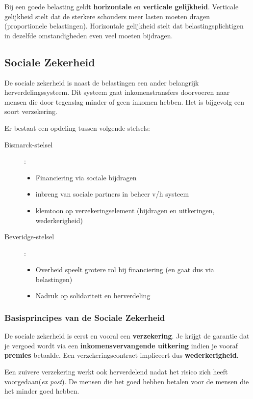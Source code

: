 Bij een goede belasting geldt \textbf{horizontale} en \textbf{verticale gelijkheid}. Verticale gelijkheid stelt dat de sterkere schouders meer lasten moeten dragen (proportionele belastingen). Horizontale gelijkheid stelt dat belastingsplichtigen in dezelfde omstandigheden even veel moeten bijdragen.

\subsection{Sociale Zekerheid}
De sociale zekerheid is naast de belastingen een ander belangrijk herverdelingssysteem. Dit systeem gaat inkomenstransfers doorvoeren naar mensen die door tegenslag minder of geen inkomen hebben. Het is bijgevolg een soort verzekering.

Er bestaat een opdeling tussen volgende stelsels:
\begin{description}
   \item[Bismarck-stelsel]:
      \begin{itemize}
         \item Financiering via sociale bijdragen
         \item inbreng van sociale partners in beheer v/h systeem
         \item klemtoon op verzekeringselement (bijdragen en uitkeringen, wederkerigheid)
      \end{itemize}
   \item[Beveridge-stelsel]:
      \begin{itemize}
         \item Overheid speelt grotere rol bij financiering (en gaat dus via belastingen)
         \item Nadruk op solidariteit en herverdeling
      \end{itemize}
\end{description}

\subsubsection{Basisprincipes van de Sociale Zekerheid}
De sociale zekerheid is eerst en vooral een \textbf{verzekering}. Je krijgt de garantie dat je vergoed wordt via een \textbf{inkomensvervangende uitkering} indien je vooraf \textbf{premies} betaalde. Een verzekeringscontract impliceert dus \textbf{wederkerigheid}.

Een zuivere verzekering werkt ook herverdelend nadat het  risico zich heeft voorgedaan(\textit{ex post}). De mensen die het goed hebben betalen voor de mensen die het minder goed hebben.

